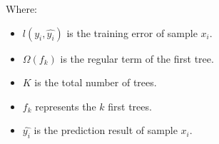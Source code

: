 \documentclass[conference]{IEEEtran}
\begin{document}
Where:\par
\begin{itemize}
    \item \(l(y_i,\hat{y_i})\) is the training error of sample \(x_i\).\par
    \item \(\Omega(f_k)\) is the regular term of the first tree.\par
    \item \(K\) is the total number of trees.\par
    \item \(f_k\) represents the \(k\) first trees.\par
    \item \(\hat{y_i}\) is the prediction result of sample \(x_i\).
\end{itemize}
\end{document}
